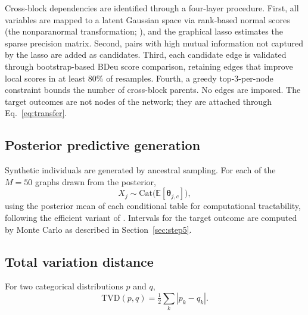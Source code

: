 Cross-block dependencies are identified through a four-layer procedure. First, all variables
are mapped to a latent Gaussian space via rank-based normal scores (the nonparanormal
transformation; \citealt{liu2009}), and the graphical lasso \citep{friedman2008} estimates
the sparse precision matrix. Second, pairs with high mutual information not captured by the
lasso are added as candidates. Third, each candidate edge is validated through
bootstrap-based BDeu score comparison, retaining edges that improve local scores in at least
80\% of resamples. Fourth, a greedy top-3-per-node constraint bounds the number of
cross-block parents. No edges are imposed. The target outcomes are not nodes of the
network; they are attached through Eq.~\eqref{eq:transfer}.

\subsection{Posterior predictive generation}

Synthetic individuals are generated by ancestral sampling. For each of the $M=50$ graphs
drawn from the posterior,
\begin{equation}
X_j \sim \mathrm{Cat}\bigl(\mathbb{E}[\boldsymbol{\theta}_{j,c}]\bigr),
\end{equation}
using the posterior mean of each conditional table for computational tractability, following
the efficient variant of \citet{martins2024}. Intervals for the target outcome are computed
by Monte Carlo as described in Section~\ref{sec:step5}.

\subsection{Total variation distance}

For two categorical distributions $p$ and $q$,
\begin{equation}
\mathrm{TVD}(p,q) = \tfrac{1}{2}\sum_k |p_k - q_k|.
\end{equation}


